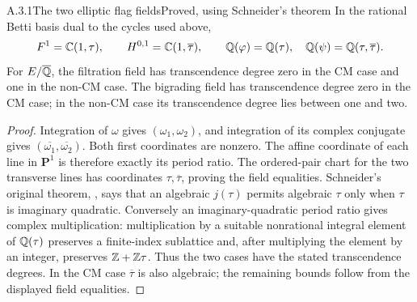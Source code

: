 \begin{result}{A.3.1}{The two elliptic flag fields}{Proved, using Schneider's theorem}
In the rational Betti basis dual to the cycles used above,
\[
 F^1=\mathbb C(1,\tau),\qquad H^{0,1}=\mathbb C(1,\overline\tau),
 \qquad \mathbb Q(\varphi)=\mathbb Q(\tau),\quad
 \mathbb Q(\psi)=\mathbb Q(\tau,\overline\tau).
\]
For $E/\overline{\mathbb Q}$, the filtration field has transcendence degree zero in the CM case and one in the non-CM case. The bigrading field has transcendence degree zero in the CM case; in the non-CM case its transcendence degree lies between one and two.
\end{result}
\begin{proof}
Integration of $\omega$ gives $(\omega_1,\omega_2)$, and integration of its complex conjugate gives $(\overline{\omega_1},\overline{\omega_2})$. Both first coordinates are nonzero. The affine coordinate of each line in $\mathbf P^1$ is therefore exactly its period ratio. The ordered-pair chart for the two transverse lines has coordinates $\tau,\overline\tau$, proving the field equalities. Schneider's original theorem, \cite[\S1, result IIc, p.5]{EllSchneider1937}, says that an algebraic $j(\tau)$ permits algebraic $\tau$ only when $\tau$ is imaginary quadratic. Conversely an imaginary-quadratic period ratio gives complex multiplication: multiplication by a suitable nonrational integral element of $\mathbb Q(\tau)$ preserves a finite-index sublattice and, after multiplying the element by an integer, preserves $\mathbb Z+\mathbb Z\tau$. Thus the two cases have the stated transcendence degrees. In the CM case $\overline\tau$ is also algebraic; the remaining bounds follow from the displayed field equalities.
\end{proof}

